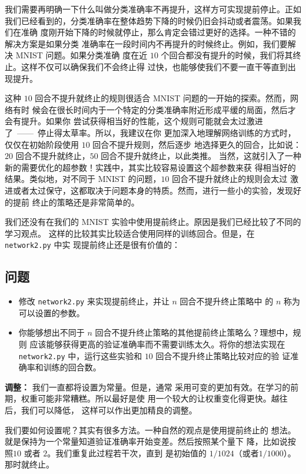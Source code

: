 我们需要再明确一下什么叫做分类准确率不再提升，这样方可实现提前停止。正如
我们已经看到的，分类准确率在整体趋势下降的时候仍旧会抖动或者震荡。如果我们在准确
度刚开始下降的时候就停止，那么肯定会错过更好的选择。一种不错的解决方案是如果分类
准确率在一段时间内不再提升的时候终止。例如，我们要解决 MNIST 问题。如果分类准确
度在近 $10$ 个回合都没有提升的时候，我们将其终止。这样不仅可以确保我们不会终止得
过快，也能够使我们不要一直干等直到出现提升。

这种 $10$ 回合不提升就终止的规则很适合 MNIST 问题的一开始的探索。然而，网络有时
候会在很长时间内于一个特定的分类准确率附近形成平缓的局面，然后才会有提升。如果你
尝试获得相当好的性能，这个规则可能就会太过激进了~——~停止得太草率。所以，我建议在你
更加深入地理解网络训练的方式时，仅仅在初始阶段使用 $10$ 回合不提升规则，然后逐步
地选择更久的回合，比如说：$20$ 回合不提升就终止，$50$ 回合不提升就终止，以此类推。
当然，这就引入了一种新的需要优化的超参数！实践中，其实比较容易设置这个超参数来获
得相当好的结果。类似地，对不同于 MNIST 的问题，$10$ 回合不提升就终止的规则会太过
激进或者太过保守，这都取决于问题本身的特质。然而，进行一些小的实验，发现好的提前
终止的策略还是非常简单的。

我们还没有在我们的 MNIST 实验中使用提前终止。原因是我们已经比较了不同的学习观点。
这样的比较其实比较适合使用同样的训练回合。但是，在 \lstinline!network2.py! 中实
现提前终止还是很有价值的：

\subsection*{问题}

\begin{itemize}
\item 修改 \lstinline!network2.py! 来实现提前终止，并让 $n$ 回合不提升终止策略中
  的 $n$ 称为可以设置的参数。
\item 你能够想出不同于 $n$ 回合不提升终止策略的其他提前终止策略么？理想中，规则
  应该能够获得更高的验证准确率而不需要训练太久。将你的想法实现在
  \lstinline!network2.py! 中，运行这些实验和 $10$ 回合不提升终止策略比较对应的验
  证准确率和训练的回合数。
\end{itemize}

\textbf{\learningrate{}调整：} 我们一直都将\learningrate{}设置为常量。但是，通常
采用可变的\learningrate{}更加有效。在学习的前期，权重可能非常糟糕。所以最好是使
用一个较大的\learningrate{}让权重变化得更快。越往后，我们可以降低\learningrate{}，
这样可以作出更加精良的调整。

我们要如何设置\learningrate{}呢？其实有很多方法。一种自然的观点是使用提前终止的
想法。就是保持\learningrate{}为一个常量知道验证准确率开始变差。然后按照某个量下
降\learningrate{}，比如说按照$10$ 或者 $2$。我们重复此过程若干次，直到%
\learningrate{}是初始值的 $1/1024$（或者$1/1000$）。那时就终止。

